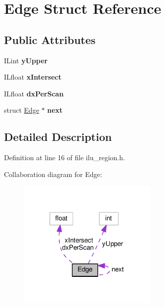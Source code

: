 \hypertarget{structEdge}{}\section{Edge Struct Reference}
\label{structEdge}
\subsection*{Public Attributes}
\begin{DoxyCompactItemize}
\item 
\mbox{\label{structEdge_a1a16dc4d2ff0f05a9e6eabc7312be54b}} 
I\+Lint {\bfseries y\+Upper}
\item 
\mbox{\label{structEdge_a582f1338a0dceb913bdafa9be91da96f}} 
I\+Lfloat {\bfseries x\+Intersect}
\item 
\mbox{\label{structEdge_ac68297f57351e80c50311788dfc7ebb7}} 
I\+Lfloat {\bfseries dx\+Per\+Scan}
\item 
\mbox{\label{structEdge_a3cf3d57ae65110456b5d809a658757fc}} 
struct \hyperlink{structEdge}{Edge} $\ast$ {\bfseries next}
\end{DoxyCompactItemize}


\subsection{Detailed Description}


Definition at line 16 of file ilu\+\_\+region.\+h.



Collaboration diagram for Edge\+:
\nopagebreak
\begin{figure}[H]
\begin{center}
\leavevmode
\includegraphics[width=193pt]{d7/d87/structEdge__coll__graph}
\end{center}
\end{figure}


